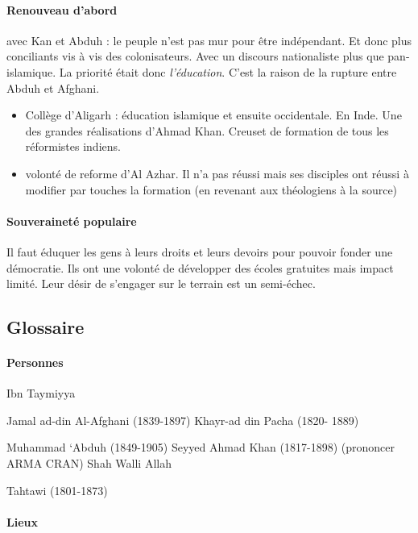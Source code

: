 \paragraph{Renouveau d'abord} avec Kan et Abduh : le peuple n'est pas mur pour être indépendant. Et donc plus conciliants vis à vis des colonisateurs. Avec un discours nationaliste plus que pan-islamique. La priorité était donc \textit{l'éducation}. C'est la raison de la rupture entre Abduh et Afghani. 
\begin{itemize}
    \item Collège d'Aligarh : éducation islamique et ensuite occidentale. En Inde. Une des grandes réalisations d'Ahmad Khan. Creuset de formation de tous les réformistes indiens.
    \item volonté de reforme d'Al Azhar. Il n'a pas réussi mais ses disciples ont réussi à modifier par touches la formation (en revenant aux théologiens à la source)
\end{itemize}

\paragraph{Souveraineté populaire} Il faut éduquer les gens à leurs droits et leurs devoirs pour pouvoir fonder une démocratie. Ils ont une volonté de développer des écoles gratuites mais impact limité. Leur désir de s'engager sur le terrain est un semi-échec.


\hypertarget{glossaire-2}{%
\subsection{\texorpdfstring{{Glossaire}}{Glossaire}}\label{glossaire-2}}


\paragraph{Personnes}

Ibn Taymiyya

Jamal ad-din Al-Afghani (1839-1897) Khayr-ad din Pacha (1820- 1889)

Muhammad `Abduh (1849-1905) Seyyed Ahmad Khan (1817-1898) (prononcer ARMA CRAN)  Shah Walli
Allah

Tahtawi (1801-1873)

\paragraph{Lieux}

